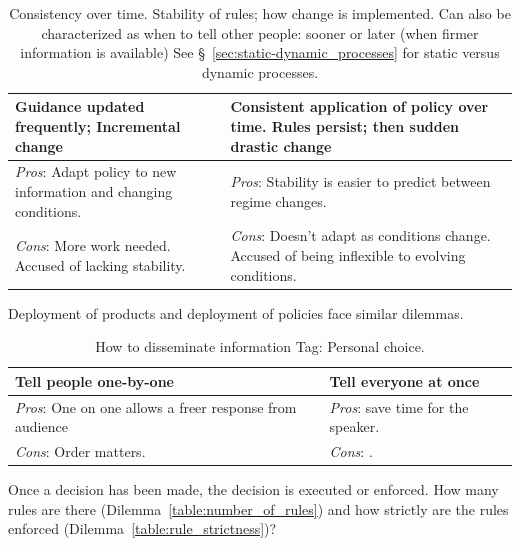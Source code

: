 \begin{center}
\begin{table}[ht]
\begin{tabular}{ | m{\dilemmatablewidth}| m{\dilemmatablewidth} | } 
  \hline
  \textbf{Guidance updated frequently; Incremental change} & 
  \textbf{Consistent application of policy over time. Rules persist; then sudden drastic change} \\ 
  \hline
  \textit{Pros}: Adapt policy to new information and changing conditions. &
  \textit{Pros}: Stability is easier to predict between regime changes.  \\
  \hline
  \textit{Cons}: More work needed. Accused of lacking stability. & 
  \textit{Cons}: Doesn't adapt as conditions change. Accused of being inflexible to evolving conditions. \\
  \hline
\end{tabular}
\caption{Consistency over time. Stability of rules; how change is implemented. Can also be characterized as when to tell other people: sooner or later (when firmer information is available) See \S~\ref{sec:static-dynamic_processes} for static versus dynamic processes.
}
\label{table:consistency}
\end{table}
\end{center}

Deployment of products and deployment of policies face similar dilemmas. 

\begin{center}
\begin{table}[ht]
\begin{tabular}{ | m{\dilemmatablewidth}| m{\dilemmatablewidth} | } 
  \hline
  \textbf{Tell people one-by-one} & 
  \textbf{Tell everyone at once} \\ 
  \hline
  \textit{Pros}: One on one allows a freer response from audience &
  \textit{Pros}: save time for the speaker. \\
  \hline
  \textit{Cons}: Order matters. & 
  \textit{Cons}: . \\  
  \hline
\end{tabular}
\caption{How to disseminate information
{\tiny Tag: Personal choice.}
}
\label{table:disseminate_one-by-one}
\end{table}
\end{center}

Once a decision has been made, the decision is executed or enforced. How many rules are there (Dilemma~\ref{table:number_of_rules}) and
how strictly are the rules enforced (Dilemma~\ref{table:rule_strictness})?

